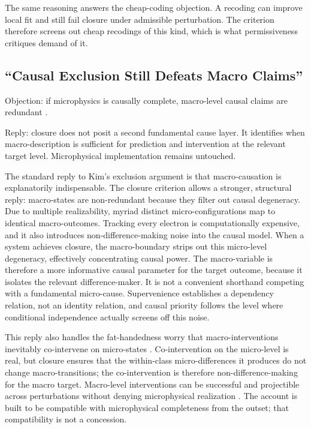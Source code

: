 The same reasoning answers the cheap-coding objection. A recoding can
improve local fit and still fail closure under admissible perturbation.
The criterion therefore screens out cheap recodings of this kind, which
is what permissiveness critiques demand of it.

\subsection{``Causal Exclusion Still Defeats Macro
	Claims''}\label{causal-exclusion-still-defeats-macro-claims}

Objection: if microphysics is causally complete, macro-level causal
claims are redundant \citep{kim1998}.

Reply: closure does not posit a second fundamental cause layer. It
identifies when macro-description is sufficient for prediction and
intervention at the relevant target level. Microphysical implementation
remains untouched.

The standard reply to Kim's exclusion argument is that macro-causation
is explanatorily indispensable. The closure criterion allows a stronger,
structural reply: macro-states are non-redundant because they filter out
causal degeneracy. Due to multiple realizability, myriad distinct
micro-configurations map to identical macro-outcomes. Tracking every
electron is computationally expensive, and it also introduces
non-difference-making noise into the causal model. When a system
achieves closure, the macro-boundary strips out this micro-level
degeneracy, effectively concentrating causal power. The macro-variable
is therefore a more informative causal parameter for the target outcome,
because it isolates the relevant difference-maker. It is not a
convenient shorthand competing with a fundamental micro-cause.
Supervenience establishes a dependency relation, not an identity
relation, and causal priority follows the level where conditional
independence actually screens off this noise.

This reply also handles the fat-handedness worry that
macro-interventions inevitably co-intervene on micro-states
\citep{dewhurst2021}. Co-intervention on the micro-level is
real, but closure ensures that the within-class micro-differences it
produces do not change macro-transitions; the co-intervention is
therefore non-difference-making for the macro target. Macro-level
interventions can be successful and projectible across perturbations
without denying microphysical realization \citep{woodward2003,pearl2000,hoel2013}.
The account is built to be compatible with microphysical completeness
from the outset; that compatibility is not a concession.

